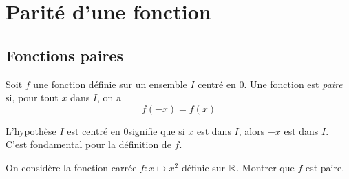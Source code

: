 \documentclass[poly]{mesCours}
\begin{document}
\vspace*{1cm}
\emptybox{4cm}

\newpage

\section{Parité d'une fonction}
\subsection*{Fonctions paires}
\begin{definition}
Soit $f$ une fonction définie sur un ensemble $I$ centré en $0$. Une fonction est \emph{paire} si, pour tout $x$ dans $I$, on a
\begin{equation*}
f(-x)=f(x)
\end{equation*}
\end{definition}
\begin{remark}
L'hypothèse \og $I$ est centré en $0$\fg signifie que si $x$ est dans $I$, alors $-x$ est dans $I$. C'est fondamental pour la définition de $f$.
\end{remark}
\begin{example}
On considère la fonction carrée $f : x \mapsto x^2$ définie sur $\mathbb{R}$. Montrer que $f$ est paire.
\end{example}
\vspace*{0.5cm}
\emptybox{3cm}
\end{document}

